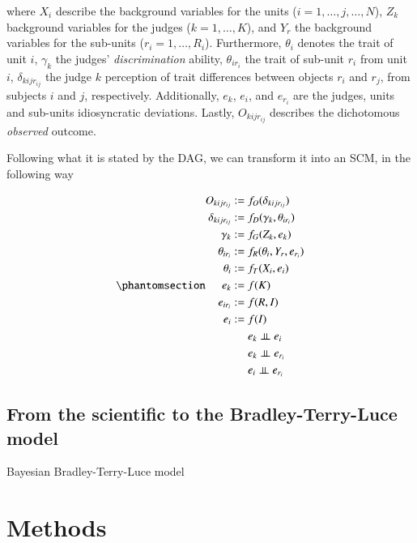 \documentclass[
  authoryear,
  preprint,
  1p]{elsarticle}
\begin{document}
where \(X_{i}\) describe the background variables for the units
(\(i = 1, \dots, j, \dots, N\)), \(Z_{k}\) background variables for the
judges (\(k = 1, \dots, K\)), and \(Y_{r}\) the background variables for
the sub-units (\(r_{i} = 1, \dots, R_{i}\)). Furthermore, \(\theta_{i}\)
denotes the trait of unit \(i\), \(\gamma_{k}\) the judges'
\emph{discrimination} ability, \(\theta_{ir_{i}}\) the trait of sub-unit
\(r_{i}\) from unit \(i\), \(\delta_{kijr_{ij}}\) the judge \(k\)
perception of trait differences between objects \(r_{i}\) and \(r_{j}\),
from subjects \(i\) and \(j\), respectively. Additionally, \(e_{k}\),
\(e_{i}\), and \(e_{r_{i}}\) are the judges, units and sub-units
idiosyncratic deviations. Lastly, \(O_{kijr_{ij}}\) describes the
dichotomous \emph{observed} outcome.

Following what it is stated by the DAG, we can transform it into an SCM,
in the following way

\begin{equation}\phantomsection\label{eq-StructuralModel}{
\begin{aligned}
  O_{kijr_{ij}} := & \; f_{O}( \delta_{kijr_{ij}} ) \\
  \delta_{kijr_{ij}} := & \; f_{D}( \gamma_{k}, \theta_{ir_{i}} ) \\
  \gamma_{k} := & \; f_{G}( Z_{k}, e_{k} ) \\
  \theta_{ir_{i}} := & \; f_{R}( \theta_{i}, Y_{r}, e_{r_{i}} ) \\
  \theta_{i} := & \; f_{T}( X_{i}, e_{i} ) \\
  e_{k} := & \; f(K) \\
  e_{ir_{i}} := & \; f(R,I) \\
  e_{i} := & \; f(I) \\
  & \; e_{k} \perp\kern-5pt\perp e_{i} \\
  & \; e_{k} \perp\kern-5pt\perp e_{r_{i}} \\
  & \; e_{i} \perp\kern-5pt\perp e_{r_{i}}
\end{aligned}
}\end{equation}

\subsection{From the scientific to the Bradley-Terry-Luce
model}\label{sec-Sci2StatMod}

Bayesian Bradley-Terry-Luce model \citep[BTL
model,][]{Bradley_et_al_1952, Luce_1959, Pollitt_2012b}

\section{Methods}\label{sec-methods}
\end{document}
